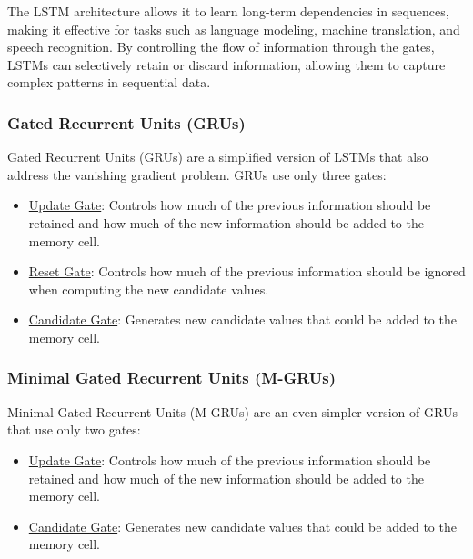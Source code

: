 The LSTM architecture allows it to learn long-term dependencies in sequences, making it effective for tasks such as language modeling, machine translation, and speech recognition. By controlling the flow of information through the gates, LSTMs can selectively retain or discard information, allowing them to capture complex patterns in sequential data.

\subsubsection{Gated Recurrent Units (GRUs)}
Gated Recurrent Units (GRUs) are a simplified version of LSTMs that also address the vanishing gradient problem. GRUs use only three gates:
\begin{itemize}
    \item \ul{Update Gate}: Controls how much of the previous information should be retained and how much of the new information should be added to the memory cell.
    \item \ul{Reset Gate}: Controls how much of the previous information should be ignored when computing the new candidate values.
    \item \ul{Candidate Gate}: Generates new candidate values that could be added to the memory cell.
\end{itemize}

\subsubsection{Minimal Gated Recurrent Units (M-GRUs)}
Minimal Gated Recurrent Units (M-GRUs) are an even simpler version of GRUs that use only two gates:
\begin{itemize}
    \item \ul{Update Gate}: Controls how much of the previous information should be retained and how much of the new information should be added to the memory cell.
    \item \ul{Candidate Gate}: Generates new candidate values that could be added to the memory cell.
\end{itemize}

